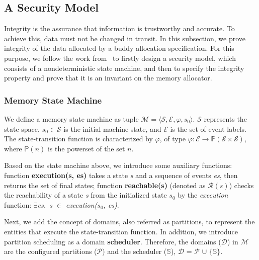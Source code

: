 %
%

\subsection{A Security Model}\label{sec:securitymodel}
Integrity is the assurance that information is trustworthy and accurate. To achieve this, data must not be changed in transit. In this subsection, we prove integrity of  the data allocated by a buddy allocation specification. For this purpose, we follow the work from~\cite{reg_securitymodel} to firstly design a security model, which consists of a nondeterministic state machine, and then to specify the integrity property and prove that it is an invariant on the memory allocator.

\subsubsection{Memory State Machine} 
We define a memory state machine as tuple $\mathcal{M} = \langle \mathcal{S}, \mathcal{E}, \varphi, s_0 \rangle$. $\mathcal{S}$ represents the state space,  $s_0 \in \mathcal{S}$ is the initial machine state, and $\mathcal{E}$ is the set of event labels. The state-transition function is characterized by $\varphi$, of type $\varphi: \mathcal{E} \rightarrow \mathbb{P}(\mathcal{S} \times \mathcal{S})$, where $\mathbb{P}(n)$ is the powerset of the set $n$.

Based on the state machine above, we introduce some auxiliary functions: function \textbf{execution(s, es)} takes a state \emph{s} and a sequence of events \emph{es}, then returns the set of final states; function \textbf{reachable(s)} (denoted as $\mathcal{R}(s)$) checks the reachability of a state \emph{s} from the initialized state $s_0$ by the \emph{execution} function: \emph{$\exists$es.\ s $\in$ execution($s_0$, es)}.

Next, we add the concept of domains, also referred as partitions, to represent the entities that execute the state-transition function. In addition, we introduce partition scheduling as a domain \textbf{scheduler}. Therefore, the domains ($\mathcal{D}$) in $\mathcal{M}$ are the configured partitions ($\mathcal{P}$) and the scheduler ($\mathbb{S}$), $\mathcal{D}$ = $\mathcal{P}$ $\cup$ $\lbrace$$\mathbb{S}$$\rbrace$.

